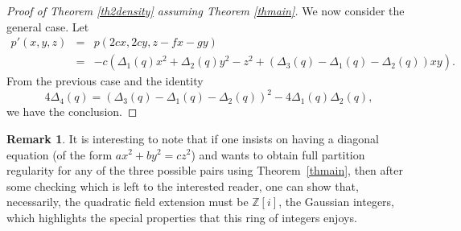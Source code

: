\documentclass[11pt]{amsart}
\theoremstyle{definition}
\newtheorem*{remark}{Remark}
\newcommand{\Z}{{\mathbb Z}}
\newcommand{\AK}[1]{{\color{ForestGreen}{{#1}}}}
\begin{document}
\begin{proof}[Proof of Theorem \ref{th2density} assuming Theorem \ref{thmain}]
\fi
     

    We now consider the general case.
    Let 
    \begin{eqnarray*}
        p'(x,y,z) & = & p(2cx,2cy,z-fx-gy) \\
        & = &-c\left(\Delta_{1}(q)x^{2}+\Delta_{2}(q)y^{2}-z^{2}+(\Delta_{3}(q)-\Delta_{1}(q)-\Delta_{2}(q))xy\right).
    \end{eqnarray*}
    From the previous case and the identity 
    $$4\Delta_{4}(q)=(\Delta_{3}(q)-\Delta_{1}(q)-\Delta_{2}(q))^{2}-4\Delta_{1}(q)\Delta_{2}(q),$$
    we have the conclusion.
\end{proof}
\begin{remark}
It is interesting to note that if one insists on having a diagonal equation (of the form $ax^2+by^2=cz^2$) and wants to obtain full partition regularity for any of the three possible pairs using Theorem~\ref{thmain}, then after some checking which is left to the interested reader, one can show that, necessarily, the quadratic field extension must be $\Z[i]$, the Gaussian integers, which highlights the special properties that this ring of integers enjoys.
\end{remark}

\iffalse
\end{document}
